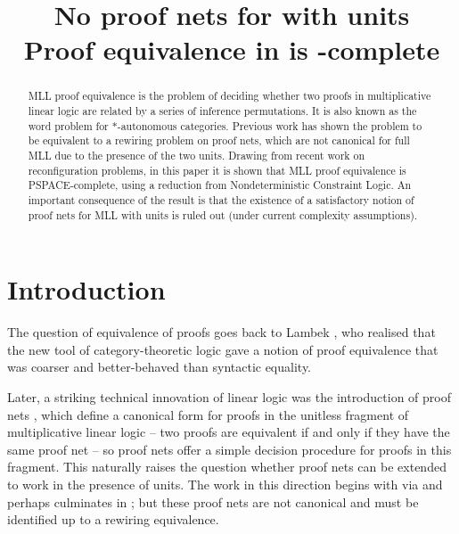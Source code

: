 \documentclass[conference]{IEEEtran}
\author{
  \IEEEauthorblockN{Willem Heijltjes}
  \IEEEauthorblockA{
  		University of Bath
	\\	Claverton Down
	\\	Bath BA2~7AY
	\\	w.b.heijltjes@bath.ac.uk
	}
\and
  \IEEEauthorblockN{Robin Houston}
  \IEEEauthorblockA{
		Kiln Enterprises
	\\	robin@kiln.it
	}
}
\title{No proof nets for \capsabbrev{mll} with units\\[5pt]\Large Proof equivalence in \capsabbrev{mll} is \capsabbrev{pspace}-complete}
\let\beforesection=\medskip
\let\aftersection=\noindent
\let\capsabbrev=\uppercase
\begin{document}
\maketitle

\begin{abstract}
\capsabbrev{mll} proof equivalence is the problem of deciding whether two proofs in multiplicative linear logic are related by a series of inference permutations.
%
It is also known as the word problem for $*$-autonomous categories.
%
Previous work has shown the problem to be equivalent to a rewiring problem on proof nets, which are not canonical for full \capsabbrev{mll} due to the presence of the two units.
%
Drawing from recent work on reconfiguration problems, in this paper it is shown that \capsabbrev{mll} proof equivalence is \capsabbrev{pspace}-complete, using a reduction from Nondeterministic Constraint Logic.
%
An important consequence of the result is that the existence of a satisfactory notion of proof nets for \capsabbrev{mll} with units is ruled out (under current complexity assumptions).
\end{abstract}


\beforesection

\section{Introduction}

\aftersection
%
The question of equivalence of proofs goes back to Lambek \cite{Lambek-1968}, who realised that the new tool of category-theoretic logic gave a notion of proof equivalence that was coarser and better-behaved than syntactic equality.

Later, a striking technical innovation of linear logic was the introduction of proof nets \cite{Girard-1987,Danos-Regnier-1989}, which define a canonical form for proofs in the unitless fragment of multiplicative linear logic -- two proofs are equivalent if and only if they have the same proof net -- so proof nets offer a simple decision procedure for proofs in this fragment. This naturally raises the question whether proof nets can be extended to work in the presence of units. The work in this direction begins with \cite{Trimble-1994,Blute-Cockett-Seely-Trimble-1996} via \cite{Strassburger-Lamarche-2004} and perhaps culminates in \cite{HughesFreeStar,HughesMLLProofNets}; but these proof nets are not canonical and must be identified up to a rewiring equivalence.
\end{document}
